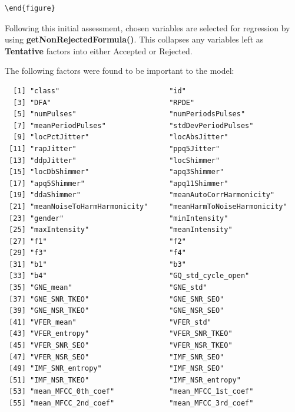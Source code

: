 \documentclass[
]{article}
\begin{document}
\begin{verbatim}
\end{figure}
\end{verbatim}

Following this initial assessment, chosen variables are selected for regression by using \textbf{getNonRejectedFormula()}. This collapses any variables left as \textbf{Tentative} factors into either Accepted or Rejected.

The following factors were found to be important to the model:

\begin{verbatim}
  [1] "class"                          "id"                            
  [3] "DFA"                            "RPDE"                          
  [5] "numPulses"                      "numPeriodsPulses"              
  [7] "meanPeriodPulses"               "stdDevPeriodPulses"            
  [9] "locPctJitter"                   "locAbsJitter"                  
 [11] "rapJitter"                      "ppq5Jitter"                    
 [13] "ddpJitter"                      "locShimmer"                    
 [15] "locDbShimmer"                   "apq3Shimmer"                   
 [17] "apq5Shimmer"                    "apq11Shimmer"                  
 [19] "ddaShimmer"                     "meanAutoCorrHarmonicity"       
 [21] "meanNoiseToHarmHarmonicity"     "meanHarmToNoiseHarmonicity"    
 [23] "gender"                         "minIntensity"                  
 [25] "maxIntensity"                   "meanIntensity"                 
 [27] "f1"                             "f2"                            
 [29] "f3"                             "f4"                            
 [31] "b1"                             "b3"                            
 [33] "b4"                             "GQ_std_cycle_open"             
 [35] "GNE_mean"                       "GNE_std"                       
 [37] "GNE_SNR_TKEO"                   "GNE_SNR_SEO"                   
 [39] "GNE_NSR_TKEO"                   "GNE_NSR_SEO"                   
 [41] "VFER_mean"                      "VFER_std"                      
 [43] "VFER_entropy"                   "VFER_SNR_TKEO"                 
 [45] "VFER_SNR_SEO"                   "VFER_NSR_TKEO"                 
 [47] "VFER_NSR_SEO"                   "IMF_SNR_SEO"                   
 [49] "IMF_SNR_entropy"                "IMF_NSR_SEO"                   
 [51] "IMF_NSR_TKEO"                   "IMF_NSR_entropy"               
 [53] "mean_MFCC_0th_coef"             "mean_MFCC_1st_coef"            
 [55] "mean_MFCC_2nd_coef"             "mean_MFCC_3rd_coef"            

\end{verbatim}
\end{document}
